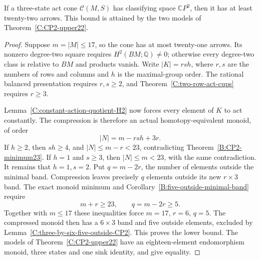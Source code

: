 \begin{theorem}
\label{C:three-state-cone-minimum22}
If a three-state act cone $\mathcal C(M,S)$ has classifying space
$\mathbb CP^2$, then it has at least twenty-two arrows.  This bound
is attained by the two models of Theorem~\ref{C:CP2-upper22}.
\end{theorem}
\begin{proof}
Suppose $m=|M|\leq17$, so the cone has at most twenty-one arrows.
Its nonzero degree-two square requires $H^2(BM;\mathbb Q)\ne0$;
otherwise every degree-two class is relative to $BM$ and products
vanish.  Write $|K|=rsh$, where $r,s$ are the numbers of rows and
columns and $h$ is the maximal-group order.  The rational balanced
presentation requires $r,s\geq2$, and
Theorem~\ref{C:two-row-act-cups} requires $r\geq3$.

Lemma~\ref{C:constant-action-quotient-H2} now forces every element
of $K$ to act constantly.  The compression is therefore an actual
homotopy-equivalent monoid, of order
\[
 |N|=m-rsh+3r.
\]
If $h\geq2$, then $sh\geq4$, and $|N|\leq m-r<23$,
contradicting Theorem~\ref{B:CP2-minimum23}.  If $h=1$ and
$s\geq3$, then $|N|\leq m<23$, with the same contradiction.
It remains that $h=1,s=2$.  Put $q=m-2r$, the number of elements
outside the minimal band.  Compression leaves precisely $q$
elements outside its new $r\times3$ band.  The exact monoid
minimum and Corollary~\ref{B:five-outside-minimal-band} require
\[
 m+r\geq23,\qquad q=m-2r\geq5.
\]
Together with $m\leq17$ these inequalities force
$m=17$, $r=6$, $q=5$.  The compressed monoid then has a
$6\times3$ band and five outside elements, excluded by
Lemma~\ref{C:three-by-six-five-outside-CP2}.
This proves the lower bound.  The models of
Theorem~\ref{C:CP2-upper22} have an eighteen-element endomorphism
monoid, three states and one sink identity, and give equality.
\end{proof}


